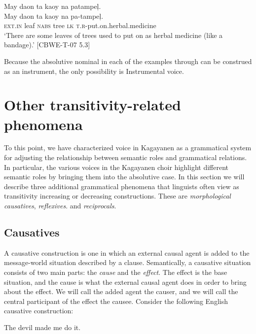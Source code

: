 \ea
\label{ex:herbalmedicine}
May	daon	ta	kaoy	na	patampeļ. \\\smallskip
\gll May	daon	ta	kaoy	na	pa-tampeļ. \\
\textsc{ext.in}	leaf	\textsc{nabs}	tree	\textsc{lk} \textsc{t.r}-put.on.herbal.medicine \\
\glt ‘There are some leaves of trees used to put on as herbal medicine (like a bandage).’ [CBWE-T-07 5.3]
\z

Because the absolutive nominal in each of the examples  through  can be construed as an instrument, the only possibility is Instrumental voice.

\section{Other transitivity-related phenomena}
\label{sec:othertransitivity}
\largerpage
To this point, we have characterized voice in Kagayanen as a grammatical system for adjusting the relationship between semantic roles and grammatical relations. In particular, the various voices in the Kagayanen choir highlight different semantic roles by bringing them into the absolutive case. In this section we will describe three additional grammatical phenomena that linguists often view as transitivity increasing or decreasing constructions. These are \textit{morphological causatives}, \textit{reflexives}. and \textit{reciprocals}.


\subsection{Causatives}
\label{bkm:Ref500569782}
\label{sec:causatives}

A causative construction is one in which an external causal agent is added to the message-world situation described by a clause. Semantically, a causative situation consists of two main parts: the \textit{cause} and the \textit{effect}. The effect is the base situation, and the cause is what the external causal agent does in order to bring about the effect. We will call the added agent the causer, and we will call the central participant of the effect the causee. Consider the following English causative construction:

\ea
The devil made me do it.
\z


